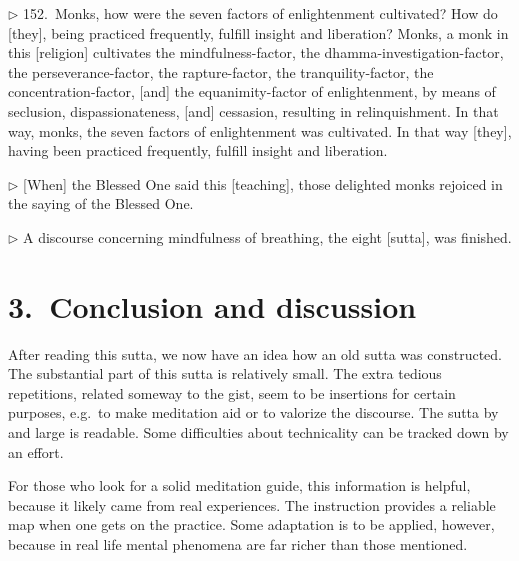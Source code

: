 \addtocounter{sennum}{-3}
$\triangleright$  152.\ Monks, how were the seven factors of enlightenment cultivated? How do [they], being practiced frequently, fulfill insight and liberation?  Monks, a monk in this [religion] cultivates the mindfulness-factor, the dhamma-investigation-factor, the perseverance-factor, the rapture-factor, the tranquility-factor, the concentration-factor, [and] the equanimity-factor of enlightenment, by means of seclusion, dispassionateness, [and] cessasion, resulting in relinquishment.  In that way, monks, the seven factors of enlightenment was cultivated. In that way [they], having been practiced frequently, fulfill insight and liberation.\\


\addtocounter{sennum}{-1}
$\triangleright$  [When] the Blessed One said this [teaching], those delighted monks rejoiced in the saying of the Blessed One.\\


\addtocounter{sennum}{-1}
$\triangleright$  A discourse concerning mindfulness of breathing, the eight [sutta], was finished.\\

{}
\section*{3.\ Conclusion and discussion}

After reading this sutta, we now have an idea how an old sutta was constructed. The substantial part of this sutta is relatively small. The extra tedious repetitions, related someway to the gist, seem to be insertions for certain purposes, e.g.\ to make meditation aid or to valorize the discourse. The sutta by and large is readable. Some difficulties about technicality can be tracked down by an effort.

For those who look for a solid meditation guide, this information is helpful, because it likely came from real experiences. The instruction provides a reliable map when one gets on the practice. Some adaptation is to be applied, however, because in real life mental phenomena are far richer than those mentioned.

